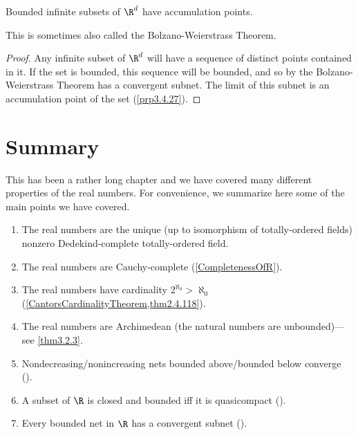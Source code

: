 \begin{crl}{}{}
Bounded infinite subsets of $\R ^d$ have accumulation points.
\begin{rmk}
This is sometimes also called the Bolzano-Weierstrass Theorem.
\end{rmk}
\begin{proof}
Any infinite subset of $\R ^d$ will have a sequence of distinct points contained in it.  If the set is bounded, this sequence will be bounded, and so by the Bolzano-Weierstrass Theorem has a convergent subnet.  The limit of this subnet is an accumulation point of the set (\cref{prp3.4.27}).
\end{proof}
\end{crl}

\section{Summary}

This has been a rather long chapter and we have covered many different properties of the real numbers.  For convenience, we summarize here some of the main points we have covered.
\begin{enumerate}
\item The real numbers are the unique (up to isomorphism of totally-ordered fields) nonzero Dedekind-complete totally-ordered field.
\item The real numbers are Cauchy-complete (\cref{CompletenessOfR}).
\item The real numbers have cardinality $2^{\aleph _0}>
\aleph _0$ (\cref{CantorsCardinalityTheorem,thm2.4.118}).
\item The real numbers are Archimedean (the natural numbers are unbounded)---see \cref{thm3.2.3}.
\item Nondecreasing/nonincreasing nets bounded above/bounded below converge ().
\item A subset of $\R$ is closed and bounded iff it is quasicompact ().
\item Every bounded net in $\R$ has a convergent subnet ().
\end{enumerate}